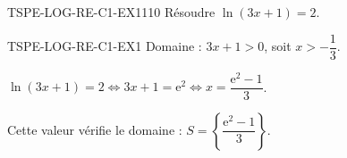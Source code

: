 

\begin{exercice}{TSPE-LOG-RE-C1-EX1}{1}{10}
Résoudre $\ln(3x+1) = 2$.
\end{exercice}


\begin{corrige}{TSPE-LOG-RE-C1-EX1}
Domaine : $3x+1>0$, soit $x > -\dfrac{1}{3}$.

$\ln(3x+1)=2 \iff 3x+1 = \mathrm{e}^2 \iff x = \dfrac{\mathrm{e}^2-1}{3}$.

Cette valeur vérifie le domaine : $S = \left\{\dfrac{\mathrm{e}^2-1}{3}\right\}$.
\end{corrige}
